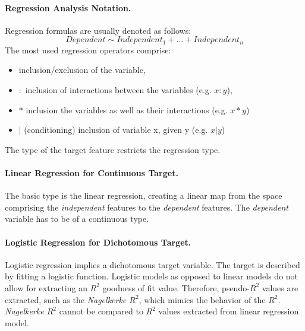 \documentclass[journal]{style/vgtc} 			          %
\newcommand{\com}[1]{\textcolor{orange}{\uline{#1}}}
\begin{document}
\paragraph{Regression Analysis Notation.} Regression formulas are usually denoted as follows:
\begin{equation}
Dependent \sim Independent_1 + ... + Independent_n
\label{eq:RegressionNotation}
\end{equation}
The most used regression operators comprise:
\begin{itemize}
	\item \fbox{$+,-$} inclusion/exclusion of the variable,
	\item $:$ inclusion of interactions between the variables (e.g. $x:y$),
	\item $*$ inclusion the variables as well as their interactions (e.g. $x*y$)
	\item $|$ (conditioning) inclusion of variable x, given y (e.g. $x|y$)
\end{itemize}
The type of the target feature restricts the regression type.

\paragraph{Linear Regression for Continuous Target.} The basic type is the linear regression, creating a linear map from the space comprising the \emph{independent} features to the \emph{dependent} features.
The \emph{dependent} variable has to be of a continuous type.

\paragraph{Logistic Regression for Dichotomous Target.} Logistic regression implies a dichotomous target variable.
The target is described by fitting a logistic function.
Logistic models as opposed to linear models do not allow for extracting an $R^2$ goodness of fit value.
Therefore, pseudo-$R^2$ values are extracted, such as the \emph{Nagelkerke $R^2$}, which mimics the behavior of the $R^2$.
\emph{Nagelkerke $R^2$} cannot be compared to $R^2$ values extracted from linear regression model.

\end{document}
